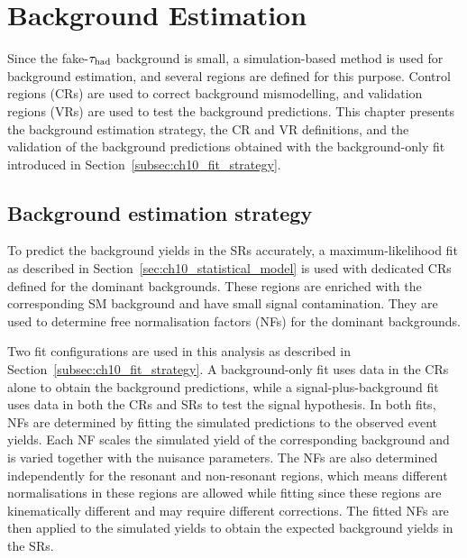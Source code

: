 \chapter{Background Estimation}
\label{chapter:background_estimation}

\providecommand{\CHEightCRFigureVersion}{hepdata}


Since the fake-$\tau_{\mathrm{had}}$ background is small, a simulation-based method is used for background estimation, and several regions are defined for this purpose.
Control regions (CRs) are used to correct background mismodelling, and validation regions (VRs) are used to test the background predictions.
This chapter presents the background estimation strategy, the CR and VR definitions, and the validation of the background predictions obtained with the background-only fit introduced in Section~\ref{subsec:ch10_fit_strategy}.

\section{Background estimation strategy}
\label{sec:ch8_strategy}

To predict the background yields in the SRs accurately, a maximum-likelihood fit as described in Section~\ref{sec:ch10_statistical_model} is used with dedicated CRs defined for the dominant backgrounds.
These regions are enriched with the corresponding SM background and have small signal contamination. They are used to determine free normalisation factors (NFs) for the dominant backgrounds.

Two fit configurations are used in this analysis as described in Section~\ref{subsec:ch10_fit_strategy}.
A background-only fit uses data in the CRs alone to obtain the background predictions, while a signal-plus-background fit uses data in both the CRs and SRs to test the signal hypothesis.
In both fits, NFs are determined by fitting the simulated predictions to the observed event yields.
Each NF scales the simulated yield of the corresponding background and is varied together with the nuisance parameters.
The NFs are also determined independently for the resonant and non-resonant regions, which means different normalisations in these regions are allowed while fitting since these regions are kinematically different and may require different corrections.
The fitted NFs are then applied to the simulated yields to obtain the expected background yields in the SRs.

